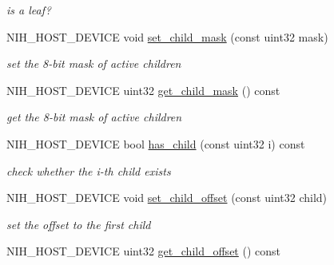 \begin{DoxyCompactItemize}
\begin{DoxyCompactList}\small\item\em is a leaf? \end{DoxyCompactList}\item 
\hypertarget{structnih_1_1_octree__node__base_ad51a440a9e3c78f5fc77eac0352a9f41}{
\-N\-I\-H\-\_\-\-H\-O\-S\-T\-\_\-\-D\-E\-V\-I\-C\-E void \hyperlink{structnih_1_1_octree__node__base_ad51a440a9e3c78f5fc77eac0352a9f41}{set\-\_\-child\-\_\-mask} (const uint32 mask)}
\label{structnih_1_1_octree__node__base_ad51a440a9e3c78f5fc77eac0352a9f41}

\begin{DoxyCompactList}\small\item\em set the 8-\/bit mask of active children \end{DoxyCompactList}\item 
\hypertarget{structnih_1_1_octree__node__base_a3cbd389263908d8da587af192bd26ee8}{
\-N\-I\-H\-\_\-\-H\-O\-S\-T\-\_\-\-D\-E\-V\-I\-C\-E uint32 \hyperlink{structnih_1_1_octree__node__base_a3cbd389263908d8da587af192bd26ee8}{get\-\_\-child\-\_\-mask} () const }
\label{structnih_1_1_octree__node__base_a3cbd389263908d8da587af192bd26ee8}

\begin{DoxyCompactList}\small\item\em get the 8-\/bit mask of active children \end{DoxyCompactList}\item 
\hypertarget{structnih_1_1_octree__node__base_a44afd7c67aee4e6c99f30f5f36be3b19}{
\-N\-I\-H\-\_\-\-H\-O\-S\-T\-\_\-\-D\-E\-V\-I\-C\-E bool \hyperlink{structnih_1_1_octree__node__base_a44afd7c67aee4e6c99f30f5f36be3b19}{has\-\_\-child} (const uint32 i) const }
\label{structnih_1_1_octree__node__base_a44afd7c67aee4e6c99f30f5f36be3b19}

\begin{DoxyCompactList}\small\item\em check whether the i-\/th child exists \end{DoxyCompactList}\item 
\hypertarget{structnih_1_1_octree__node__base_a445c05a1dad7940e72f5e3560e2455c8}{
\-N\-I\-H\-\_\-\-H\-O\-S\-T\-\_\-\-D\-E\-V\-I\-C\-E void \hyperlink{structnih_1_1_octree__node__base_a445c05a1dad7940e72f5e3560e2455c8}{set\-\_\-child\-\_\-offset} (const uint32 child)}
\label{structnih_1_1_octree__node__base_a445c05a1dad7940e72f5e3560e2455c8}

\begin{DoxyCompactList}\small\item\em set the offset to the first child \end{DoxyCompactList}\item 
\hypertarget{structnih_1_1_octree__node__base_a4f8cb62de288321daa16596a3988e12f}{
\-N\-I\-H\-\_\-\-H\-O\-S\-T\-\_\-\-D\-E\-V\-I\-C\-E uint32 \hyperlink{structnih_1_1_octree__node__base_a4f8cb62de288321daa16596a3988e12f}{get\-\_\-child\-\_\-offset} () const }
\label{structnih_1_1_octree__node__base_a4f8cb62de288321daa16596a3988e12f}


\end{DoxyCompactItemize}
